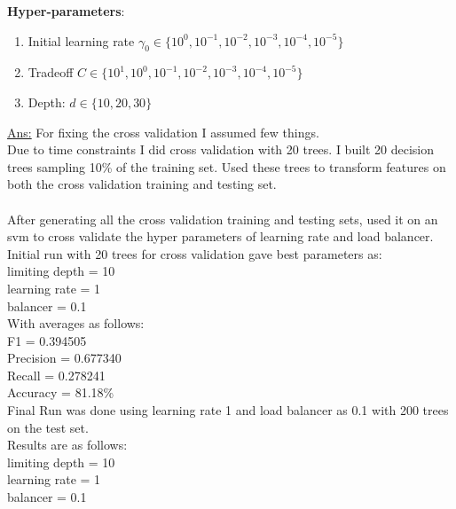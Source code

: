 \begin{enumerate}
  \textbf{Hyper-parameters}:
  \begin{enumerate}
  \item Initial learning rate $\gamma_0 \in\{10^0, 10^{-1}, 10^{-2}, 10^{-3}, 10^{-4}, 10^{-5}\}$
  \item Tradeoff $C \in \{10^1, 10^0, 10^{-1}, 10^{-2}, 10^{-3}, 10^{-4}, 10^{-5}\}$
  \item Depth: $d \in \{10, 20, 30\}$
  \end{enumerate}
\underline{Ans:} For fixing the cross validation I assumed few things.\\
Due to time constraints I did cross validation with 20 trees. I built 20 decision trees sampling 10\% of the training set. Used these trees to transform features on both the cross validation training and testing set.\\\\
After generating all the cross validation training and testing sets, used it on an svm to cross validate the hyper parameters of learning rate and load balancer.\\
Initial run with 20 trees for cross validation gave best parameters as:\\
\hspace*{4mm}limiting depth = 10 \\
\hspace*{4mm}learning rate = 1\\
\hspace*{4mm}balancer = 0.1\\
\hspace*{2mm}With averages as follows:\\
\hspace*{4mm}F1 = 0.394505\\
\hspace*{4mm}Precision = 0.677340\\
\hspace*{4mm}Recall = 0.278241\\
\hspace*{4mm}Accuracy = 81.18\%\\
Final Run was done using learning rate 1 and load balancer as 0.1 with 200 trees on the test set.\\
Results are as follows:\\
\hspace*{4mm}limiting depth = 10 \\
\hspace*{4mm}learning rate = 1\\
\hspace*{4mm}balancer = 0.1\\

\end{enumerate}
